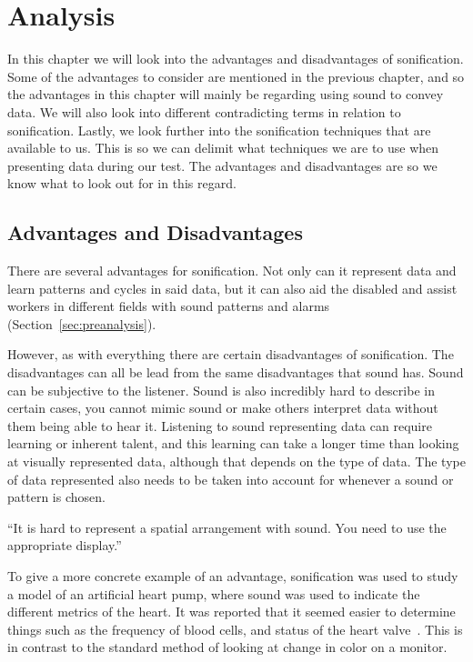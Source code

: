
\section{Analysis} %
\label{sec:analysis}

In this chapter we will look into the advantages and disadvantages of sonification. Some of the advantages to consider are mentioned in the previous chapter, and so the advantages in this chapter will mainly be regarding using sound to convey data. We will also look into different contradicting terms in relation to sonification. Lastly, we look further into the sonification techniques that are available to us. This is so we can delimit what techniques we are to use when presenting data during our test. The advantages and disadvantages are so we know what to look out for in this regard.


\FloatBarrier
\subsection{Advantages and Disadvantages} %
\label{sub:advantages_and_disadvantages_of_sonification}

There are several advantages for sonification. Not only can it represent data and learn patterns and cycles in said data, but it can also aid the disabled and assist workers in different fields with sound patterns and alarms (Section~\ref{sec:preanalysis}).

However, as with everything there are certain disadvantages of sonification. The disadvantages can all be lead from the same disadvantages that sound has. Sound can be subjective to the listener. Sound is also incredibly hard to describe in certain cases, you cannot mimic sound or make others interpret data without them being able to hear it. Listening to sound representing data can require learning or inherent talent, and this learning can take a longer time than looking at visually represented data, although that depends on the type of data. The type of data represented also needs to be taken into account for whenever a sound or pattern is chosen. 


\enquote{It is hard to represent a spatial arrangement with sound. You need to use the appropriate display.}~\cite*[pp.21-22]{Feder2012}

To give a more concrete example of an advantage, sonification was used to study a model of an artificial heart pump, where sound was used to indicate the different metrics of the heart. It was reported that it seemed easier to determine things such as the frequency of blood cells, and status of the heart valve~\cite*[pp.24]{Barrass1999}.
This is in contrast to the standard method of looking at change in color on a monitor. 

